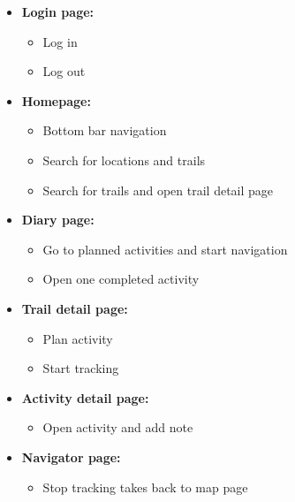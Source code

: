 \documentclass[12pt]{article}
\begin{document}
\begin{itemize}
    \item \textbf{Login page:}
        \begin{itemize}
            \item Log in
            \item Log out
        \end{itemize}
    \item \textbf{Homepage:}
        \begin{itemize}
            \item Bottom bar navigation
            \item Search for locations and trails
            \item Search for trails and open trail detail page
        \end{itemize}
    \item \textbf{Diary page:}
        \begin{itemize}
            \item Go to planned activities and start navigation
            \item Open one completed activity
        \end{itemize}
    \item \textbf{Trail detail page:}
        \begin{itemize}
            \item Plan activity
            \item Start tracking
        \end{itemize}
    \item \textbf{Activity detail page:}
        \begin{itemize}
            \item Open activity and add note
        \end{itemize}
    \item \textbf{Navigator page:}
        \begin{itemize}
            \item Stop tracking takes back to map page
        \end{itemize}
\end{itemize}
\end{document}
